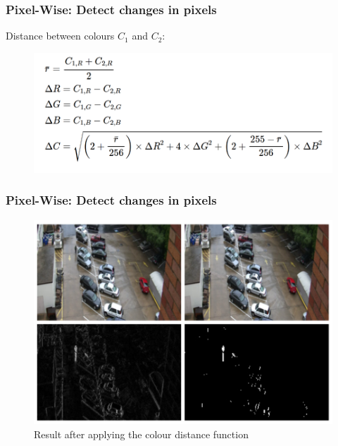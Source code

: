 \documentclass[13.5pt,aspecratio=169, xcolor=dvipsnames]{beamer}
\begin{document}

\begin{frame}
    \onehalfspacing
        \frametitle{Pixel-Wise: Detect changes in pixels}
        
        
        \begin{minipage}{0.53\textwidth}
            \begin{block}{}
                Distance between colours $C_1$ and $C_2$:
            \end{block}
        \end{minipage}
        


        \bigskip

        \begin{figure}
           \centering
           \includegraphics[width=\linewidth]{color_distance.png}
        \end{figure}

        \bigskip

      
\end{frame}
    

\begin{frame}
    \onehalfspacing
        \frametitle{Pixel-Wise: Detect changes in pixels}
        
        

            \begin{figure}
                \centering
                \includegraphics[width=0.85\linewidth]{Pixel_wise_color_distance_result.png}
                \caption{ Result after applying the colour distance function}
             \end{figure}
        
      
\end{frame}
    
\end{document}
